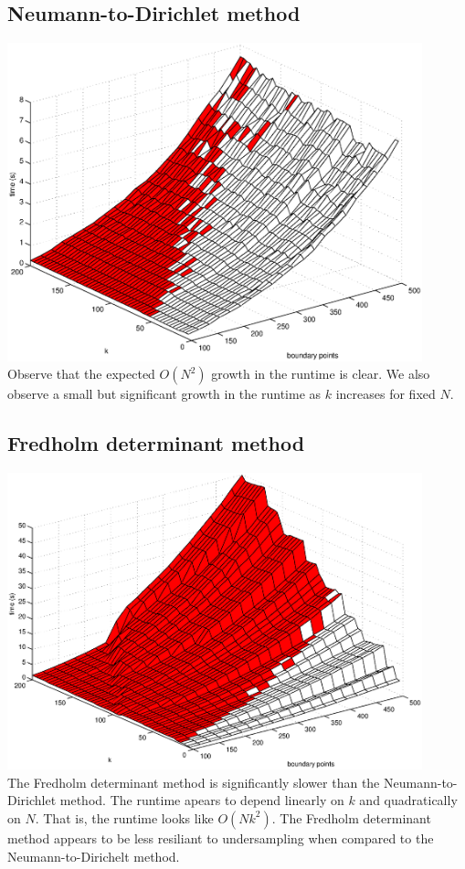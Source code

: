 \documentclass{article}
\begin{document}
\subsection{Neumann-to-Dirichlet method}
\includegraphics[width=0.9\textwidth]{dtn.eps} \\
Observe that the expected $O(N^2)$ growth in the runtime is clear.
We also observe a small but significant growth in the runtime as $k$ increases for fixed $N$.
\subsection{Fredholm determinant method}
\includegraphics[width=0.9\textwidth]{fd.eps} \\
The Fredholm determinant method is significantly slower than the Neumann-to-Dirichlet method.
The runtime apears to depend linearly on $k$ and quadratically on $N$.
That is, the runtime looks like $O(Nk^2)$.
The Fredholm determinant method appears to be less resiliant to undersampling when compared to the Neumann-to-Dirichelt method.
\end{document}
